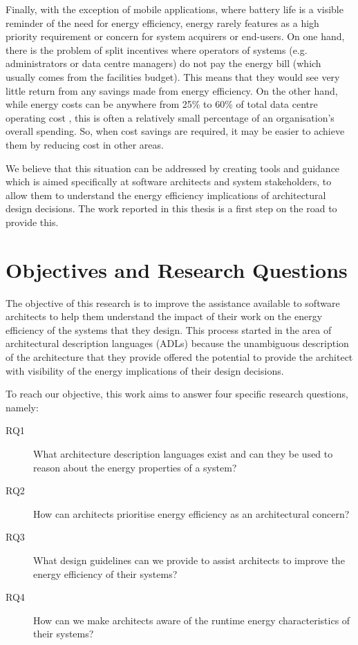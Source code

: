 Finally, with the exception of mobile applications, where battery life is a visible reminder of the need for energy efficiency, energy rarely features as a high priority requirement or concern for system acquirers or end-users. On one hand, there is the problem of split incentives where operators of systems (e.g. administrators or data centre managers) do not pay the energy bill (which usually comes from the facilities budget). This means that they would see very little return from any savings made from energy efficiency. On the other hand, while energy costs can be anywhere from 25\% to 60\% of total data centre operating cost \cite{techuk2013-dcpower}, this is often a relatively small percentage of an organisation's overall spending. So, when cost savings are required, it may be easier to achieve them by reducing cost in other areas.

We believe that this situation can be addressed by creating tools and guidance which is aimed specifically at software architects and system stakeholders, to allow them to understand the energy efficiency implications of architectural design decisions.  The work reported in this thesis is a first step on the road to provide this.

\section{Objectives and Research Questions}

The objective of this research is to improve the assistance available to software architects to help them understand the impact of their work on the energy efficiency of the systems that they design.  This process started in the area of architectural description languages (ADLs) because the unambiguous description of the architecture that they provide offered the potential to provide the architect with visibility of the energy implications of their design decisions.

To reach our objective, this work aims to answer four specific research questions, namely:
\begin{description}
\item [RQ1] What architecture description languages exist and can they be used to reason about the energy properties of a system?
\item [RQ2] How can architects prioritise energy efficiency as an architectural concern?
\item [RQ3] What design guidelines can we provide to assist architects to improve the energy efficiency of their systems?
\item [RQ4] How can we make architects aware of the runtime energy characteristics of their systems?
\end{description}


